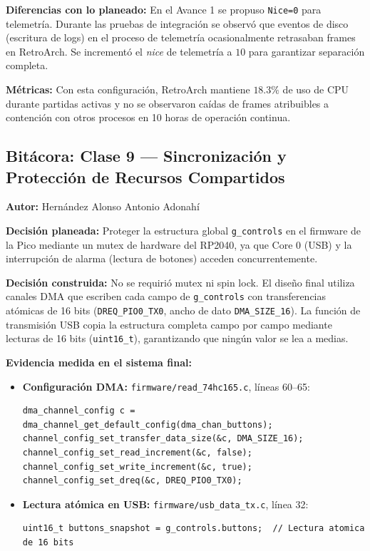 \textbf{Diferencias con lo planeado:} En el Avance 1 se propuso \texttt{Nice=0} para telemetría. Durante las pruebas de integración se observó que eventos de disco (escritura de logs) en el proceso de telemetría ocasionalmente retrasaban frames en RetroArch. Se incrementó el \textit{nice} de telemetría a $10$ para garantizar separación completa.

\textbf{Métricas:} Con esta configuración, RetroArch mantiene $18.3\%$ de uso de CPU durante partidas activas y no se observaron caídas de frames atribuibles a contención con otros procesos en 10 horas de operación continua.

\subsection{Bitácora: Clase 9 — Sincronización y Protección de Recursos Compartidos}
\textbf{Autor:} Hernández Alonso Antonio Adonahí

\textbf{Decisión planeada:} Proteger la estructura global \texttt{g\_controls} en el firmware de la Pico mediante un mutex de hardware del RP2040, ya que Core 0 (USB) y la interrupción de alarma (lectura de botones) acceden concurrentemente.

\textbf{Decisión construida:} No se requirió mutex ni spin lock. El diseño final utiliza canales DMA que escriben cada campo de \texttt{g\_controls} con transferencias atómicas de 16 bits (\texttt{DREQ\_PIO0\_TX0}, ancho de dato \texttt{DMA\_SIZE\_16}). La función de transmisión USB copia la estructura completa campo por campo mediante lecturas de 16 bits (\texttt{uint16\_t}), garantizando que ningún valor se lea a medias.

\textbf{Evidencia medida en el sistema final:}
\begin{itemize}
	\item \textbf{Configuración DMA:} \texttt{firmware/read\_74hc165.c}, líneas 60--65:
	\begin{lstlisting}
dma_channel_config c = dma_channel_get_default_config(dma_chan_buttons);
channel_config_set_transfer_data_size(&c, DMA_SIZE_16);
channel_config_set_read_increment(&c, false);
channel_config_set_write_increment(&c, true);
channel_config_set_dreq(&c, DREQ_PIO0_TX0);
	\end{lstlisting}
	\item \textbf{Lectura atómica en USB:} \texttt{firmware/usb\_data\_tx.c}, línea 32:
	\begin{lstlisting}
uint16_t buttons_snapshot = g_controls.buttons;  // Lectura atomica de 16 bits
	\end{lstlisting}
\end{itemize}

